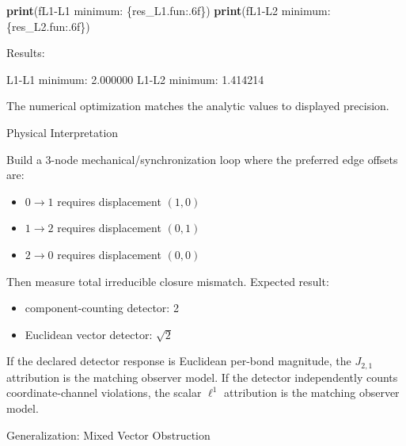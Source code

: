 \documentclass[
  11pt,
]{article}
\newenvironment{Shaded}{\begin{snugshade}}{\end{snugshade}}
\newcommand{\BuiltInTok}[1]{\textcolor[rgb]{0.39,0.29,0.61}{\textbf{#1}}}
\newcommand{\NormalTok}[1]{\textcolor[rgb]{0.12,0.11,0.11}{#1}}
\newcommand{\SpecialCharTok}[1]{\textcolor[rgb]{0.24,0.68,0.91}{#1}}
\newcommand{\SpecialStringTok}[1]{\textcolor[rgb]{1.00,0.33,0.00}{#1}}
\providecommand{\tightlist}{%
  \setlength{\itemsep}{0pt}\setlength{\parskip}{0pt}}
\providecommand{\tightlist}{%
  \setlength{\itemsep}{0pt}\setlength{\parskip}{0pt}}
\begin{document}
\begin{Shaded}
\begin{Highlighting}[]
\BuiltInTok{print}\NormalTok{(}\SpecialStringTok{f\textquotesingle{}L1{-}L1 minimum: }\SpecialCharTok{\{}\NormalTok{res\_L1}\SpecialCharTok{.}\NormalTok{fun}\SpecialCharTok{:.6f\}}\SpecialStringTok{\textquotesingle{}}\NormalTok{)}
\BuiltInTok{print}\NormalTok{(}\SpecialStringTok{f\textquotesingle{}L1{-}L2 minimum: }\SpecialCharTok{\{}\NormalTok{res\_L2}\SpecialCharTok{.}\NormalTok{fun}\SpecialCharTok{:.6f\}}\SpecialStringTok{\textquotesingle{}}\NormalTok{)}
\end{Highlighting}
\end{Shaded}

Results:

\begin{Shaded}
\begin{Highlighting}[]
\NormalTok{L1{-}L1 minimum: 2.000000}
\NormalTok{L1{-}L2 minimum: 1.414214}
\end{Highlighting}
\end{Shaded}

The numerical optimization matches the analytic values to displayed precision.

Physical Interpretation

Build a 3-node mechanical/synchronization loop where the preferred edge offsets are:

\begin{itemize}
\tightlist
\item
  \(0\to1\) requires displacement \((1,0)\)
\item
  \(1\to2\) requires displacement \((0,1)\)
\item
  \(2\to0\) requires displacement \((0,0)\)
\end{itemize}

Then measure total irreducible closure mismatch.
Expected result:

\begin{itemize}
\tightlist
\item
  component-counting detector: 2
\item
  Euclidean vector detector: \(\sqrt{2}\)
\end{itemize}

If the declared detector response is Euclidean per-bond magnitude, the \(J_{2,1}\) attribution is the matching observer model. If the detector independently counts coordinate-channel violations, the scalar \(\ell^1\) attribution is the matching observer model.

Generalization: Mixed Vector Obstruction
\end{document}
